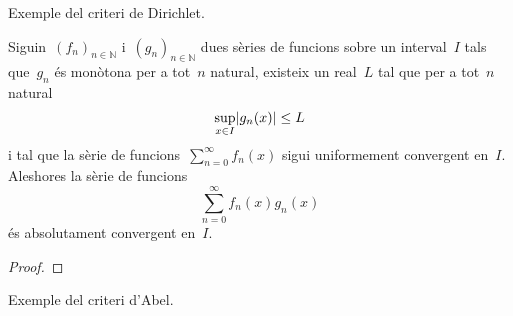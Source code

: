 \documentclass[../../main.tex]{subfiles}
\begin{document}
	\begin{example}
		Exemple del criteri de Dirichlet.
		\begin{solution}
		\end{solution}
	\end{example}
	\begin{theorem}
		\label{thm:criteri d'Abel}
		Siguin~\((f_{n})_{n\in\mathbb{N}}\) i~\((g_{n})_{n\in\mathbb{N}}\) dues sèries de funcions sobre un interval~\(I\) tals que~\(g_{n}\) és monòtona per a tot~\(n\) natural, existeix un real~\(L\) tal que per a tot~\(n\) natural
		\[
		    \sup_{x\in I}\abs{g_{n}(x)}\leq L
		\]
		i tal que la sèrie de funcions~\(\sum_{n=0}^{\infty}f_{n}(x)\) sigui uniformement convergent en~\(I\).
		Aleshores la sèrie de funcions
		\[
		    \sum_{n=0}^{\infty}f_{n}(x)g_{n}(x)
		\]
		és absolutament convergent en~\(I\).
		\begin{proof}
		\end{proof}
	\end{theorem}
	\begin{example}
		Exemple del criteri d'Abel.
		\begin{solution}
		\end{solution}
	\end{example}
\end{document}
